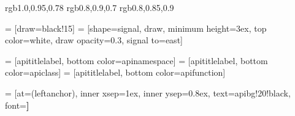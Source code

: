 
%
%
\definecolor{apinamespace} {rgb}{1.0,0.95,0.78}
\definecolor{apifunction}  {rgb}{0.8,0.9,0.7}
\definecolor{apiclass}     {rgb}{0.8,0.85,0.9}

%
%
    = [draw=black!15]
 = [shape=signal, draw,
                             minimum height=3ex, top color=white,
                             draw opacity=0.3,
                             signal to=east]

 = [apititlelabel, bottom color=apinamespace]
     = [apititlelabel, bottom color=apiclass]
  = [apititlelabel, bottom color=apifunction]

 = [at=(leftanchor), inner xsep=1ex, inner ysep=0.8ex,
                               text=apibg!20!black, font=\bfseries \small]


